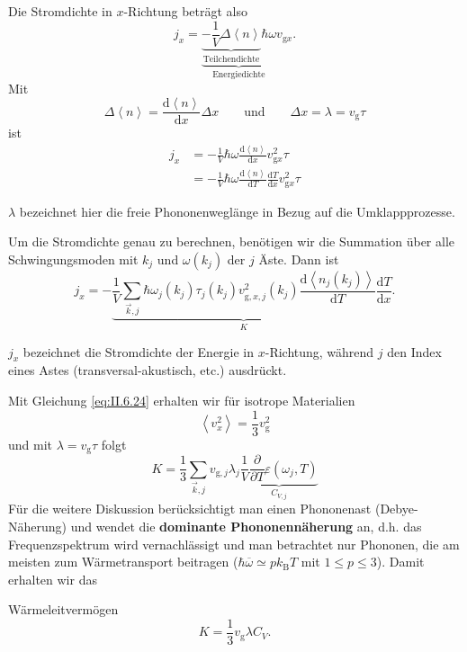 	Die Stromdichte in $x$-Richtung beträgt also
	$$
	j_{x} = \underbrace{\underbrace{- \frac{1}{V} \Delta \left< n \right>}_{\text{Teilchendichte}} \hbar \omega}_{\text{Energiedichte}} v_{\text{g}x}.
	$$  
	Mit
	$$
	\Delta \left<n \right> = \frac{\mathrm{d}\left<n \right>}{\mathrm{d}x} \Delta x \qquad \text{und}\qquad \Delta x = \lambda = v_{\text{g}} \tau
	$$
	ist
	$$
	\begin{aligned}
		j_{x} &= - \frac{1}{V} \hbar  \omega \frac{\mathrm{d}\left< n \right>}{\mathrm{d}x} v_{\text{g}x}^2 \tau  \\
		&= -\frac{1}{V} \hbar \omega \frac{\mathrm{d} \left< n \right>}{\mathrm{d}T} \frac{\mathrm{d}T}{\mathrm{d}x} v_{\text{g}x}^2 \tau   
	\end{aligned}
	$$
	\begin{verbal}
		$\lambda$ bezeichnet hier die freie Phononenweglänge in Bezug auf die Umklappprozesse.
	\end{verbal}
	Um die Stromdichte genau zu berechnen, benötigen wir die Summation über alle Schwingungsmoden mit $k_{j}$ und $\omega\left( k_{j} \right) $ der $j$ Äste. Dann ist
	\begin{equation}
		\label{eq:II.6.25}
		j_{x} = - \underbrace{\frac{1}{V} \sum_{\Vec{k}, j}^{} \hbar \omega_{j} \left( k_{j} \right) \tau_{j} (k_{j}) v_{\text{g},x,j}^2 (k_{j}) \frac{\mathrm{d} \left<n_{j} (k_{j}) \right>}{\mathrm{d}T}}_{K} \frac{\mathrm{d}T}{\mathrm{d}x}.
	\end{equation}
	\begin{verbal}
		$j_x$ bezeichnet die Stromdichte der Energie in $x$-Richtung, während $j$ den Index eines Astes (transversal-akustisch, etc.) ausdrückt.
	\end{verbal}
	Mit Gleichung \eqref{eq:II.6.24} erhalten wir für isotrope Materialien
	$$
	\left<v_{x}^2 \right> = \frac{1}{3} v_{\text{g}}^2
	$$ 
	und mit $\lambda = v_{\text{g}} \tau $ folgt
	\begin{equation}
		\label{eq:II.6.26}
		K = \frac{1}{3} \sum_{\Vec{k}, j}^{}  v_{\text{g},j} \lambda_{j} \underbrace{\frac{1}{V} \frac{\partial }{\partial T} \varepsilon(\omega_{j}, T)}_{C_{V,j}}
	\end{equation}
	Für die weitere Diskussion berücksichtigt man einen Phononenast (Debye-Näherung) und wendet die \textbf{dominante Phononennäherung} an, d.h. das Frequenzspektrum wird vernachlässigt und man betrachtet nur Phononen, die am meisten zum Wärmetransport beitragen ($\hbar \overline{\omega} \simeq p k_{\mathrm{B}} T$ mit $1 \le p \le 3$).
	Damit erhalten wir das
	\begin{important}
		Wärmeleitvermögen
		\begin{equation}
			\label{eq:II.6.27}
			K = \frac{1}{3} v_{\mathrm{g}} \lambda C_{V}.
		\end{equation}
	\end{important}
	

